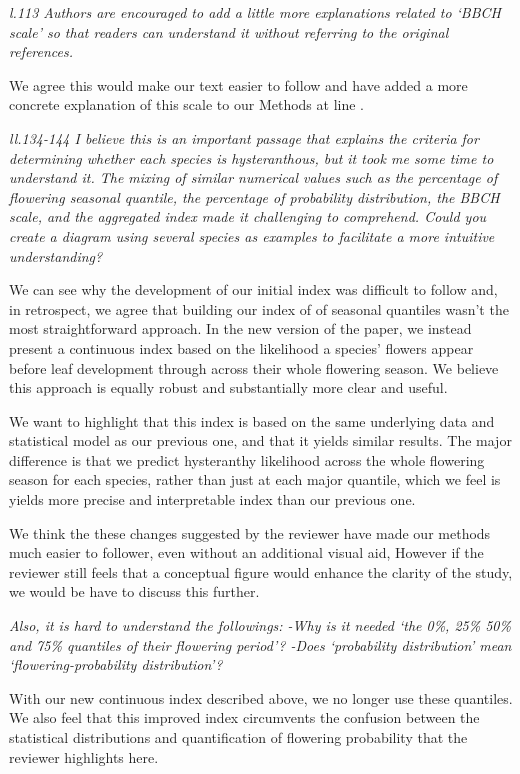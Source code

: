 \documentclass{article}[12pt]
\begin{document}
\emph{l.113 Authors are encouraged to add a little more explanations related to ‘BBCH scale’ so that readers can understand it without referring to the original references.}

We agree this would make our text easier to follow and have added a more concrete explanation of this scale to our Methods at line  .

\emph{ll.134-144 I believe this is an important passage that explains the criteria for determining whether each species is hysteranthous, but it took me some time to understand it. The mixing of similar numerical values such as the percentage of flowering seasonal quantile, the percentage of probability distribution, the BBCH scale, and the aggregated index made it challenging to comprehend. Could you create a diagram using several species as examples to facilitate a more intuitive understanding?}

We can see why the development of our initial index was difficult to follow and, in retrospect, we agree that building our index of of seasonal quantiles wasn't the most straightforward approach.  In the new version of the paper, we instead present a continuous index based on the likelihood a species' flowers appear before leaf development through across their whole flowering season. We believe this approach is equally robust and substantially more clear and useful. 

We want to highlight that this index is based on the same underlying data and statistical model as our previous one, and that it yields similar results. The major difference is that we predict hysteranthy likelihood across the whole flowering season for each species, rather than just at each major quantile, which we feel is yields more precise and interpretable index than our previous one.

We think the these changes suggested by the reviewer have made our methods much easier to follower, even without an additional visual aid, However if the reviewer still feels that a conceptual figure would enhance the clarity of the study, we would be have to discuss this further.

\emph{Also, it is hard to understand the followings:
-Why is it needed ‘the 0\%, 25\% 50\% and 75\% quantiles of their flowering period’?
-Does ‘probability distribution’ mean ‘flowering-probability distribution’?}

With our new continuous index described above, we no longer use these quantiles. We also feel that this improved index circumvents the confusion between the statistical distributions and quantification of flowering probability that the reviewer highlights here. 
\end{document}
